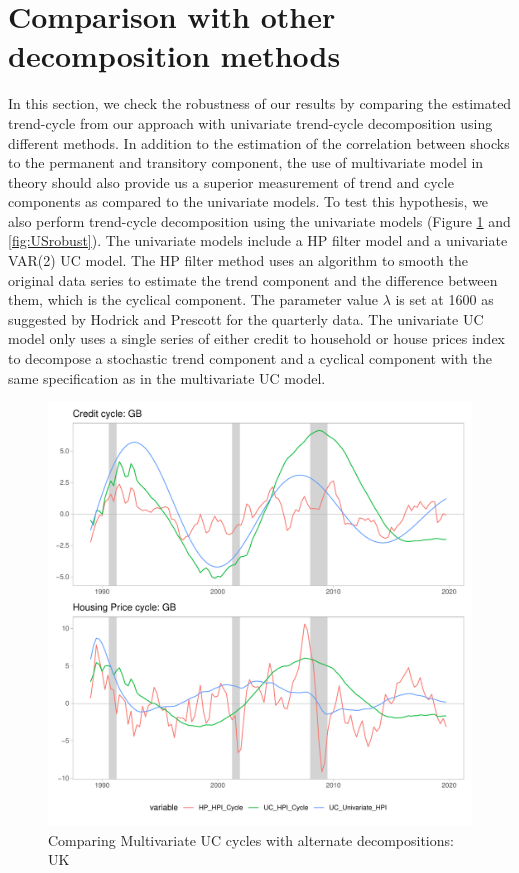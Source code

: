 \documentclass[
  12pt,
]{article}
\begin{document}
\hypertarget{comparison-with-other-decomposition-methods}{%
\section{Comparison with other decomposition methods}\label{comparison-with-other-decomposition-methods}}

In this section, we check the robustness of our results by comparing the estimated trend-cycle from our approach with univariate trend-cycle decomposition using different methods. In addition to the estimation of the correlation between shocks to the permanent and transitory component, the use of multivariate model in theory should also provide us a superior measurement of trend and cycle components as compared to the univariate models. To test this hypothesis, we also perform trend-cycle decomposition using the univariate models (Figure \ref{fig:UKrobust} and \ref{fig:USrobust}). The univariate models include a HP filter model and a univariate VAR(2) UC model. The HP filter method uses an algorithm to smooth the original data series to estimate the trend component and the difference between them, which is the cyclical component. The parameter value \(\lambda\) is set at 1600 as suggested by Hodrick and Prescott for the quarterly data. The univariate UC model only uses a single series of either credit to household or house prices index to decompose a stochastic trend component and a cyclical component with the same specification as in the multivariate UC model.

\begin{figure}

{\centering \includegraphics[width=0.85\linewidth]{../../Regression/AR_2/Output/graphs/HP_Credit_2graphs_GB} 

}

\caption{Comparing Multivariate UC cycles with alternate decompositions: UK}\label{fig:UKrobust}
\end{figure}
\end{document}
